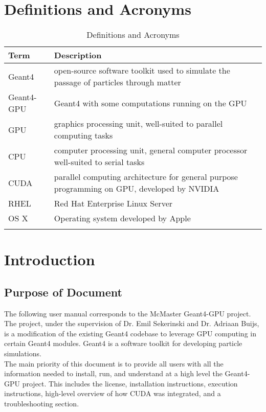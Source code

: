 \documentclass[12pt]{article}
\begin{document}
\section{Definitions and Acronyms} %
\begin{table}[h]
\centering
\caption{Definitions and Acronyms}
\begin{tabularx}{\textwidth}{l|X}
\Xhline{2\arrayrulewidth}
\bf Term & \bf Description\\
\hline
Geant4 & open-source software toolkit used to simulate the passage of particles through matter\\\hline
Geant4-GPU & Geant4 with some computations running on the GPU\\\hline
GPU & graphics processing unit, well-suited to parallel computing tasks\\\hline
CPU & computer processing unit, general computer processor well-suited to serial tasks\\\hline
CUDA & parallel computing architecture for general purpose programming on GPU, developed by NVIDIA\\\hline
RHEL & Red Hat Enterprise Linux Server\\\hline
OS X & Operating system developed by Apple\\
\Xhline{2\arrayrulewidth}
\end{tabularx}
\end{table}



\section{Introduction} %
\subsection{Purpose of Document} %
The following user manual corresponds to the McMaster Geant4-GPU project. The project, under the supervision of Dr. Emil Sekerinski and Dr. Adriaan Buijs, is a modification of the existing Geant4 codebase to leverage GPU computing in certain Geant4 modules. Geant4 is a software toolkit for developing particle simulations.\\

The main priority of this document is to provide all users with all the information needed to install, run, and understand at a high level the Geant4-GPU project. This includes the license, installation instructions, execution instructions, high-level overview of how CUDA was integrated, and a troubleshooting section.\\
\end{document}
